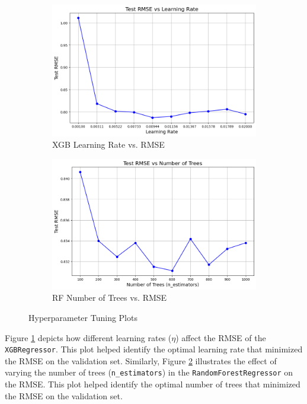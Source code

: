 \documentclass[12pt]{article}
\begin{document}
\begin{figure}[H]
\centering
\begin{subfigure}[b]{0.48\textwidth}
    \includegraphics[width=\textwidth]{images/xgb_plot.png}
    \caption{XGB Learning Rate vs. RMSE}
    \label{fig:xgb_plot}
\end{subfigure}
\hfill
\begin{subfigure}[b]{0.48\textwidth}
    \includegraphics[width=\textwidth]{images/rf_plot.png}
    \caption{RF Number of Trees vs. RMSE}
    \label{fig:rf_plot}
\end{subfigure}
\caption{Hyperparameter Tuning Plots}
\label{fig:hyperparameter_tuning}
\end{figure}

Figure \ref{fig:xgb_plot} depicts how different learning rates ($\eta$) affect the RMSE of the \texttt{XGBRegressor}. This plot helped identify the optimal learning rate that minimized the RMSE on the validation set. Similarly, Figure \ref{fig:rf_plot} illustrates the effect of varying the number of trees (\texttt{n\_estimators}) in the \texttt{RandomForestRegressor} on the RMSE. This plot helped identify the optimal number of trees that minimized the RMSE on the validation set.
\end{document}
